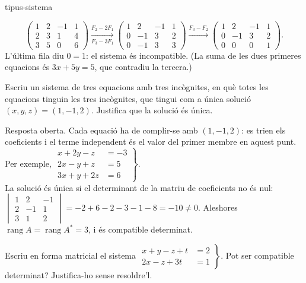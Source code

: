 \begin{apartats}
\begin{tria}{tipus-sistema}
\begin{solucio}
\[
\left(\begin{array}{ccc|c}1&2&-1&1\\2&3&1&4\\3&5&0&6\end{array}\right)
\xrightarrow[F_3-3F_1]{F_2-2F_1}
\left(\begin{array}{ccc|c}1&2&-1&1\\0&-1&3&2\\0&-1&3&3\end{array}\right)
\xrightarrow{F_3-F_2}
\left(\begin{array}{ccc|c}1&2&-1&1\\0&-1&3&2\\0&0&0&1\end{array}\right).
\]
L'última fila diu $0=1$: el sistema és incompatible. (La suma de les dues primeres equacions és
$3x+5y=5$, que contradiu la tercera.)
\end{solucio}

Escriu un sistema de tres equacions amb tres incògnites, en què totes les equacions tinguin les tres
incògnites, que tingui com a única solució $(x,y,z)=(1,-1,2)$. Justifica que la solució és única.

\begin{solucio}
Resposta oberta. Cada equació ha de complir-se amb $(1,-1,2)$: es trien els coeficients i el terme
independent és el valor del primer membre en aquest punt. Per exemple,
$\left.\begin{aligned}x+2y-z&=-3\\2x-y+z&=5\\3x+y+2z&=6\end{aligned}\right\}$.\\
La solució és única si el determinant de la matriu de coeficients no és nul:
$\begin{vmatrix}1&2&-1\\2&-1&1\\3&1&2\end{vmatrix}=-2+6-2-3-1-8=-10\ne0$. Aleshores
$\operatorname{rang}A=\operatorname{rang}A^*=3$, i és compatible determinat.
\end{solucio}
\end{tria}

\begin{nomesllarg}
Escriu en forma matricial el sistema $\left.\begin{aligned}x+y-z+t&=2\\2x-z+3t&=1\end{aligned}\right\}$.
Pot ser compatible determinat? Justifica-ho sense resoldre'l.


\end{nomesllarg}
\end{apartats}
